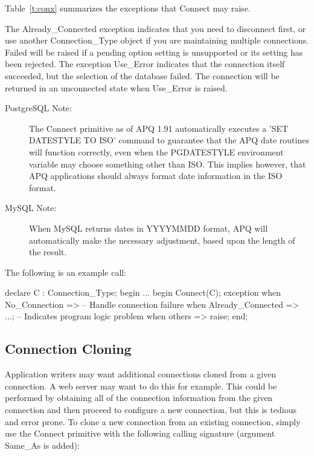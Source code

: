 \documentclass[english,letterpaper]{book}
\begin{document}
Table~\ref{t:conx} summarizes the exceptions that Connect may raise.

The Already\_Connected exception indicates that you need to disconnect
first, or use another Connection\_Type object if you are maintaining
multiple connections. Failed will be raised if a pending option setting
is unsupported or its setting has been rejected. The exception Use\_Error
indicates that the connection itself succeeded, but the selection
of the database failed. The connection will be returned in an unconnected
state when Use\_Error is raised.

\begin{description}
   \item[PostgreSQL Note:] The Connect primitive as of APQ 1.91 automatically executes a 'SET
      DATESTYLE TO ISO'  command to guarantee that the APQ date routines
      will function correctly, even when the PGDATESTYLE environment variable
      may choose something other than ISO. This implies however, that APQ
      applications should always format date information in the ISO format.
   \item[MySQL Note:]When MySQL returns dates in YYYYMMDD format, APQ
      will automatically make the necessary adjustment, based upon the length
      of the result.
\end{description}

The following is an example call:

\begin{Example}
declare
   C : Connection_Type;
begin
   ...
   begin
      Connect(C);
   exception
      when No_Connection =>
         -- Handle connection failure
      when Already_Connected =>
         ...; -- Indicates program logic problem
      when others =>
         raise;
   end;
\end{Example}

\subsection{Connection Cloning\label{Connection Cloning}}

Application writers may want additional connections cloned from a
given connection. A web server may want to do this for example. This
could be performed by obtaining all of the connection information
from the given connection and then proceed to configure a new connection,
but this is tedious and error prone. To clone a new connection from
an existing connection, simply use the Connect primitive with the
following calling signature (argument Same\_As is added):
\end{document}
